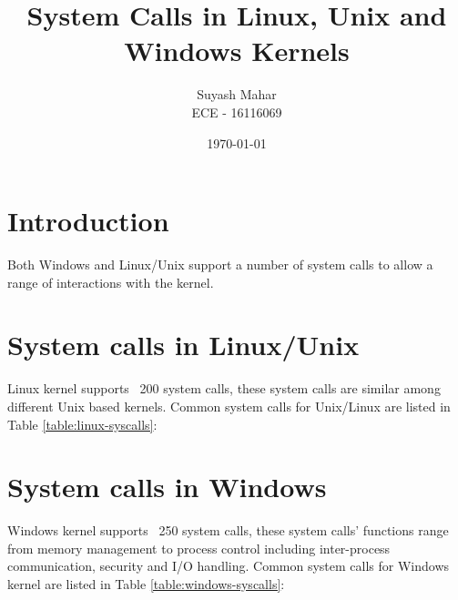 \documentclass[a4,11pt]{article}
\title{System Calls in Linux, Unix and Windows Kernels}
\author{Suyash Mahar \\
  ECE - 16116069
}
\date{\today}
\begin{document}
\maketitle


\section{Introduction}
Both Windows and Linux/Unix support a number of system calls to
allow a range of interactions with the kernel.

\section{System calls in Linux/Unix}
Linux kernel supports ~200 system calls, these system calls are
similar among different Unix based kernels. Common system calls for
Unix/Linux are listed in Table \ref{table:linux-syscalls}:

\section{System calls in Windows}
Windows kernel supports ~250 system calls, these system calls'
functions range from memory management to process control including
inter-process communication, security and I/O handling. Common system
calls for Windows kernel are listed in Table \ref{table:windows-syscalls}:
\end{document}
